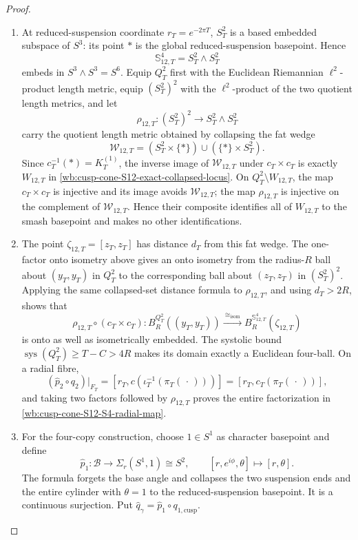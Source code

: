 \begin{proof}
\begin{enumerate}[label=\arabic*.,leftmargin=*]
\item At reduced-suspension coordinate \(r_T=e^{-2\pi T}\), \(S_T^2\) is a based
embedded subspace of \(S^3\): its point \(*\) is the global
reduced-suspension basepoint.  Hence
\[
 \mathbb S_{12,T}^4=S_T^2\wedge S_T^2
\]
embeds in \(S^3\wedge S^3=S^6\).  Equip \(Q_T^2\) first with the Euclidean
Riemannian \(\ell^2\)-product length metric, equip \((S_T^2)^2\) with the
\(\ell^2\)-product of the two quotient length metrics, and let
\[
 \rho_{12,T}:(S_T^2)^2\longrightarrow S_T^2\wedge S_T^2
\]
carry the quotient length metric obtained by collapsing the fat wedge
\[
 \mathcal W_{12,T}
 =(S_T^2\times\{*\})\cup(\{*\}\times S_T^2).
\]
Since \(c_T^{-1}(*)=K_T^{(1)}\), the inverse image of
\(\mathcal W_{12,T}\) under \(c_T\times c_T\) is exactly \(W_{12,T}\) in
\cref{wb:cusp-cone-S12-exact-collapsed-locus}.  On
\(Q_T^2\setminus W_{12,T}\), the map \(c_T\times c_T\) is injective and its
image avoids \(\mathcal W_{12,T}\); the map \(\rho_{12,T}\) is injective on
the complement of \(\mathcal W_{12,T}\).  Hence their composite identifies
all of \(W_{12,T}\) to the smash basepoint and makes no other
identifications.

\item The point \(\zeta_{12,T}=[z_T,z_T]\) has distance \(d_T\) from this fat
wedge.  The one-factor onto isometry above gives an onto isometry from the
radius-\(R\) ball about \((y_T,y_T)\) in \(Q_T^2\) to the corresponding
ball about \((z_T,z_T)\) in \((S_T^2)^2\).  Applying the same collapsed-set
distance formula to \(\rho_{12,T}\), and using \(d_T>2R\), shows that
\begin{equation}
 \rho_{12,T}\circ(c_T\times c_T):
 B_R^{Q_T^2}((y_T,y_T))
 \xrightarrow{\ \cong_{\mathrm{isom}}\ }
 B_R^{\mathbb S_{12,T}^4}(\zeta_{12,T})
 \label{wb:cusp-cone-S12-onto-exact-ball}
\end{equation}
is onto as well as isometrically embedded.  The systolic bound
\(\operatorname{sys}(Q_T^2)\geq T-C>4R\) makes its domain exactly a
Euclidean four-ball.  On a radial fibre,
\[
 (\widehat p_2\circ q_2)|_{F_T}
 =[r_T,c(\iota_T^{-1}(\pi_T(\,\cdot\,)))]
 =[r_T,c_T(\pi_T(\,\cdot\,))],
\]
and taking two factors followed by \(\rho_{12,T}\) proves the entire
factorization in \cref{wb:cusp-cone-S12-S4-radial-map}.

\item For the four-copy construction, choose \(1\in S^1\) as character basepoint
and define
\[
 \widehat p_1:\mathcal B\longrightarrow\Sigma_r(S^1,1)\cong S^2,
 \qquad
 [r,e^{i\phi},\theta]\longmapsto[r,\theta].
\]
The formula forgets the base angle and collapses the two suspension ends
and the entire cylinder with \(\theta=1\) to the reduced-suspension
basepoint.  It is a continuous surjection.  Put
\(\widehat q_\gamma=\widehat p_1\circ q_{1,\mathrm{cusp}}\).


\end{enumerate}
\end{proof}
